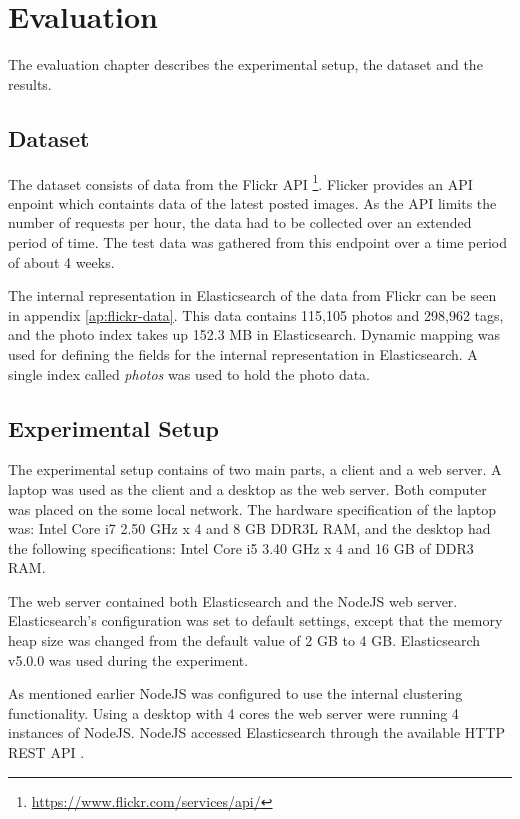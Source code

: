 \chapter{Evaluation}
\label{ch:evaluation}
The evaluation chapter describes the experimental setup, the dataset and the results.

\section{Dataset}
\label{sec:dataset}
The dataset consists of data from the Flickr API \footnote{\url{https://www.flickr.com/services/api/}}.
Flicker provides an API enpoint which containts data of the latest posted images.
As the API limits the number of requests per hour, the data had to be collected over an extended period of time.
The test data was gathered from this endpoint over a time period of about 4 weeks.

The internal representation in Elasticsearch of the data from Flickr can be seen in appendix \ref{ap:flickr-data}.
This data contains 115,105 photos and 298,962 tags, and the photo index takes up 152.3 MB in Elasticsearch.
Dynamic mapping was used for defining the fields for the internal representation in Elasticsearch.
A single index called \textit{photos} was used to hold the photo data.

\section{Experimental Setup}
The experimental setup contains of two main parts, a client and a web server.
A laptop was used as the client and a desktop as the web server.
Both computer was placed on the some local network.
The hardware specification of the laptop was: Intel Core i7 2.50 GHz x 4 and 8 GB DDR3L RAM,
and the desktop had the following specifications: Intel Core i5 3.40 GHz x 4 and 16 GB of DDR3 RAM.

The web server contained both Elasticsearch and the NodeJS web server.
Elasticsearch's configuration was set to default settings,
except that the memory heap size was changed from the default value of 2 GB to 4 GB.
Elasticsearch v5.0.0 was used during the experiment.

As mentioned earlier NodeJS was configured to use the internal clustering functionality.
Using a desktop with 4 cores the web server were running 4 instances of NodeJS.
NodeJS accessed Elasticsearch through the available HTTP REST API \cite{elasticsearch-rest-api}.

